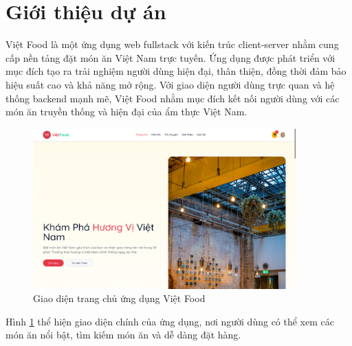 \section{Giới thiệu dự án}
Việt Food là một ứng dụng web fullstack với kiến trúc client-server nhằm cung cấp nền tảng đặt món ăn Việt Nam trực tuyến. Ứng dụng được phát triển với mục đích tạo ra trải nghiệm người dùng hiện đại, thân thiện, đồng thời đảm bảo hiệu suất cao và khả năng mở rộng. Với giao diện người dùng trực quan và hệ thống backend mạnh mẽ, Việt Food nhằm mục đích kết nối người dùng với các món ăn truyền thống và hiện đại của ẩm thực Việt Nam.

\begin{figure}[H]
    \centering
    \includegraphics[width=0.9\textwidth]{images/home-page.png}
    \caption{Giao diện trang chủ ứng dụng Việt Food}
    \label{fig:home-page}
\end{figure}

Hình \ref{fig:home-page} thể hiện giao diện chính của ứng dụng, nơi người dùng có thể xem các món ăn nổi bật, tìm kiếm món ăn và dễ dàng đặt hàng.

